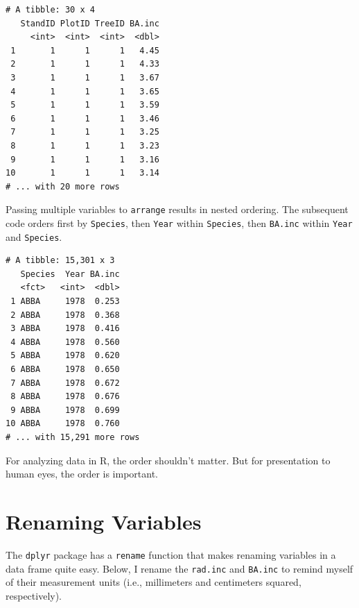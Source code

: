 \documentclass[]{krantz}
\makeatletter
\newenvironment{Shaded}{\begin{snugshade}}{\end{snugshade}}
\newcommand{\KeywordTok}[1]{\textcolor[rgb]{0.27,0.27,0.27}{\textbf{#1}}}
\newcommand{\StringTok}[1]{\textcolor[rgb]{0.5,0.5,0.5}{#1}}
\newcommand{\OperatorTok}[1]{\textcolor[rgb]{0.43,0.43,0.43}{\textbf{#1}}}
\newcommand{\NormalTok}[1]{#1}
\newenvironment{kframe}{%
\medskip{}
\setlength{\fboxsep}{.8em}
 \def\at@end@of@kframe{}%
 \ifinner\ifhmode%
  \def\at@end@of@kframe{\end{minipage}}%
  \begin{minipage}{\columnwidth}%
 \fi\fi%
 \def\FrameCommand##1{\hskip\@totalleftmargin \hskip-\fboxsep
 \colorbox{shadecolor}{##1}\hskip-\fboxsep
     \hskip-\linewidth \hskip-\@totalleftmargin \hskip\columnwidth}%
 \MakeFramed {\advance\hsize-\width
   \@totalleftmargin\z@ \linewidth\hsize
   \@setminipage}}%
 {\par\unskip\endMakeFramed%
 \at@end@of@kframe}
\renewenvironment{Shaded}{\begin{kframe}}{\end{kframe}}
\theoremstyle{definition}
\theoremstyle{definition}
\theoremstyle{definition}
\theoremstyle{remark}
\makeatother
\begin{document}
\begin{verbatim}
# A tibble: 30 x 4
   StandID PlotID TreeID BA.inc
     <int>  <int>  <int>  <dbl>
 1       1      1      1   4.45
 2       1      1      1   4.33
 3       1      1      1   3.67
 4       1      1      1   3.65
 5       1      1      1   3.59
 6       1      1      1   3.46
 7       1      1      1   3.25
 8       1      1      1   3.23
 9       1      1      1   3.16
10       1      1      1   3.14
# ... with 20 more rows
\end{verbatim}

Passing multiple variables to \texttt{arrange} results in nested
ordering. The subsequent code orders first by \texttt{Species}, then
\texttt{Year} within \texttt{Species}, then \texttt{BA.inc} within
\texttt{Year} and \texttt{Species}.

\begin{Shaded}
\end{Shaded}

\begin{verbatim}
# A tibble: 15,301 x 3
   Species  Year BA.inc
   <fct>   <int>  <dbl>
 1 ABBA     1978  0.253
 2 ABBA     1978  0.368
 3 ABBA     1978  0.416
 4 ABBA     1978  0.560
 5 ABBA     1978  0.620
 6 ABBA     1978  0.650
 7 ABBA     1978  0.672
 8 ABBA     1978  0.676
 9 ABBA     1978  0.699
10 ABBA     1978  0.760
# ... with 15,291 more rows
\end{verbatim}

For analyzing data in R, the order shouldn't matter. But for
presentation to human eyes, the order is important.

\section{Renaming Variables}\label{renaming-variables}

The \texttt{dplyr} package has a \texttt{rename} function that makes
renaming variables in a data frame quite easy. Below, I rename the
\texttt{rad.inc} and \texttt{BA.inc} to remind myself of their
measurement units (i.e., millimeters and centimeters squared,
respectively).
\end{document}
